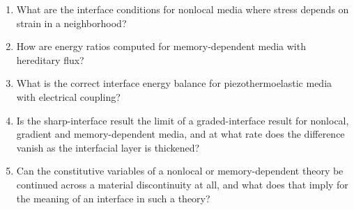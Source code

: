 \begin{enumerate}[label=\textbf{OQ9.\arabic*}]
\item What are the interface conditions for nonlocal media where stress depends on strain in a neighborhood? \\ \label{oq:9.1}
\item How are energy ratios computed for memory-dependent media with hereditary flux? \\ \label{oq:9.2}
\item What is the correct interface energy balance for piezothermoelastic media with electrical coupling? \\ \label{oq:9.3}
\item Is the sharp-interface result the limit of a graded-interface result for nonlocal, gradient and memory-dependent media, and at what rate does the difference vanish as the interfacial layer is thickened? \\ \label{oq:9.4}
\item Can the constitutive variables of a nonlocal or memory-dependent theory be continued across a material discontinuity at all, and what does that imply for the meaning of an interface in such a theory? \\ \label{oq:9.5}
\end{enumerate}

